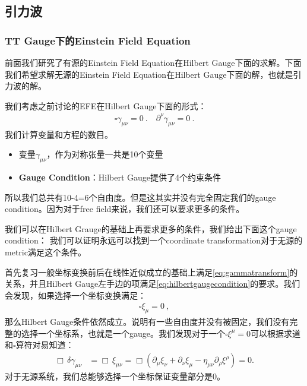 \subsection{引力波}
\subsubsection{TT Gauge下的Einstein Field Equation}

前面我们研究了有源的Einstein Field Equation在Hilbert
Gauge下面的求解。下面我们希望求解无源的Einstein Field Equation在Hilbert Gauge下面的解，也就是引力波的解。

\bigskip
{}

我们考虑之前讨论的EFE在Hilbert Gauge下面的形式：
\begin{align}
  \square\gamma_{\mu\nu}=0\mathrm{~.} \quad \partial^\nu
  \gamma_{\mu\nu}=0\mathrm{~.}
\end{align}
我们计算变量和方程的数目。
\begin{itemize}
  \item 变量$ \gamma_{\mu\nu} $，作为对称张量一共是10个变量
  \item \textbf{Gauge Condition}：Hilbert Gauge提供了4个约束条件
\end{itemize}
所以我们总共有10-4=6个自由度。但是这其实并没有完全固定我们的gauge condition。因为对于free field来说，我们还可以要求更多的条件。

\bigskip
{}

我们可以在Hilbert Grauge的基础上再要求更多的条件，我们给出下面这个gauge condition：
我们可以证明永远可以找到一个coordinate transformation对于无源的metric满足这个条件。

\bigskip
{}

首先复习一般坐标变换前后在线性近似成立的基础上满足\cref{eq:gammatransform}的关系，并且Hilbert
Gauge左手边的项满足\cref{eq:hilbertgaugecondition}的要求。我们会发现，如果选择一个坐标变换满足：
\begin{align}
  \square\xi_\mu = 0\mathrm{~,}
\end{align}
那么Hilbert
Gauge条件依然成立。说明有一些自由度并没有被固定，我们没有完整的选择一个坐标系，也就是一个gauge。我们发现对于一个$
\square \xi^\mu = 0 $可以根据求道和$ \square $算符对易知道：
\begin{align}
  \Box\, \delta\gamma_{\mu\nu}
  &= \Box\, \xi_{\mu\nu}
  = \Box\!\left( \partial_\mu \xi_\nu + \partial_\nu \xi_\mu
  - \eta_{\mu\nu} \partial_\rho \xi^\rho \right)
  = 0 .
\end{align}
对于无源系统，我们总能够选择一个坐标保证变量部分是0。

